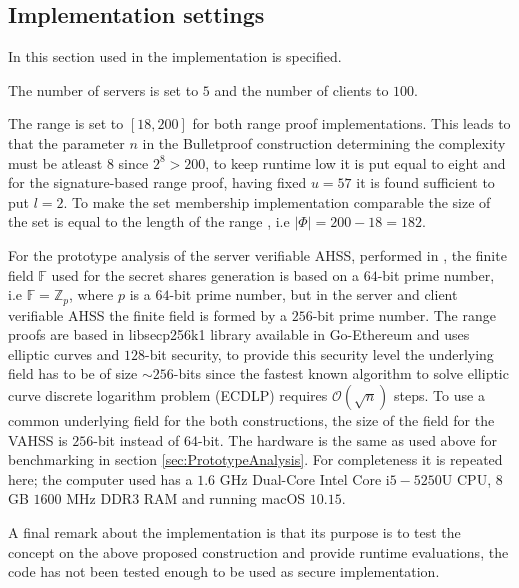 \subsection*{Implementation settings}

In this section used in the implementation is specified. 

The number of servers is set to $5$ and the number of clients to $100$. 

The range is set to $[18,200]$ for both range proof implementations. This leads to that the parameter $n$ in the Bulletproof construction determining the complexity must be atleast $8$ since $2^8>200$, to keep runtime low it is put equal to eight and for the signature-based range proof, having fixed $u=57$ it is found sufficient to put $l=2$. To make the set membership implementation comparable the size of the set is equal to the length of the range , i.e $|\Phi|=200-18 = 182$.

For the prototype analysis of the server verifiable AHSS, performed in \cite{VAHSS}, the finite field $\mathds{F}$ used for the secret shares generation is based on a $64$-bit prime number, i.e $\mathds{F}=\mathds{Z}_p$, where $p$ is a $64$-bit prime number,  but in the server and client verifiable AHSS the finite field is formed by a $256$-bit prime number.  The range proofs are based in libsecp256k1 library available in Go-Ethereum and uses elliptic curves and $128$-bit security, to provide this security level the underlying field has to be of size $\sim 256$-bits since the fastest known algorithm to solve elliptic curve discrete logarithm problem (ECDLP) requires $\mathcal{O}(\sqrt{n})$ steps. To use a common underlying field  for the both constructions,  the size of the field for the VAHSS is $256$-bit instead of $64$-bit. The hardware is the same as used above for benchmarking in section \ref{sec:PrototypeAnalysis}. For completeness it is repeated here; the computer used has a $1.6$ GHz Dual-Core Intel Core i$5-5250$U CPU, $8$GB $1600$ MHz DDR3 RAM  and running macOS $10.15$. 





A final remark about the implementation is that its purpose is to test the concept on the above proposed construction and provide runtime evaluations, the code has not been tested enough to be used as secure implementation.




